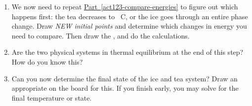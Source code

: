 \begin{enumerate}
\begin{enumerate}
		\item We now need to repeat \hyperref[act123-compare-energies]{Part~\ref*{act123-compare-energies}} to figure out which happens first: the tea decreases to \unit[0]{\textdegree C},  or the ice goes through an entire phase change. Draw {\em NEW initial points} and determine which changes in energy you need to compare. Then draw the \EnergyDiagrams, and do the calculations.
		
		\item Are the two physical systems in thermal equilibrium at the end of this step?  How do you know this?
		
		\item Can you now determine the final state of the ice and tea system? Draw an appropriate \EnergyDiagram on the board for this. If you finish early, you may solve for the final temperature or state.

\WCD

	\end{enumerate}
\end{enumerate}